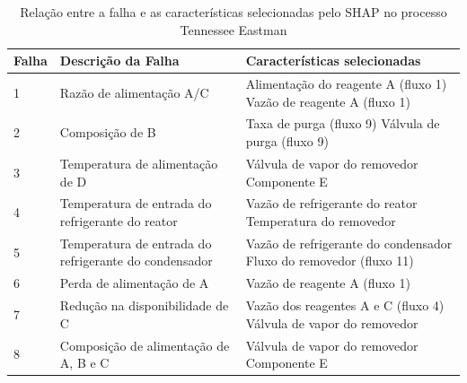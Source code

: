 \documentclass[
	12pt,				%
	openright,			%
	oneside,			%
	a4paper,			%
	english,			%
	french,				%
	spanish,			%
	brazil				%
	]{abntex2}
\begin{document}
\begin{apendicesenv}
  \begin{table}[!htbp]
    \centering
    \caption{ Relação entre a falha e as características selecionadas pelo SHAP no processo Tennessee Eastman }
    \begin{tabularx}{\textwidth}{|l|X|X|}
      \hline
      \textbf{\textbf{Falha}} & \textbf{\textbf{Descrição da Falha}}                  & \textbf{\textbf{Características selecionadas}}                                           \\ \hline
      1                       & Razão de alimentação A/C                              & Alimentação do reagente A (fluxo 1) \newline Vazão de reagente A (fluxo 1)               \\ \hline
      2                       & Composição de B                                       & Taxa de purga (fluxo 9) \newline Válvula de purga (fluxo 9)                              \\ \hline
      3                       & Temperatura de alimentação de D                       & Válvula de vapor do removedor \newline Componente E                                      \\ \hline
      4                       & Temperatura de entrada do refrigerante do reator      & Vazão de refrigerante do reator \newline Temperatura do removedor                        \\ \hline
      5                       & Temperatura de entrada do refrigerante do condensador & Vazão de refrigerante do condensador \newline Fluxo do removedor (fluxo 11)              \\ \hline
      6                       & Perda de alimentação de A                             & Vazão de reagente A (fluxo 1)                                                            \\ \hline
      7                       & Redução na disponibilidade de C                       & Vazão dos reagentes A e C (fluxo 4) \newline Válvula de vapor do removedor               \\ \hline
      8                       & Composição de alimentação de A, B e C                 & Válvula de vapor do removedor \newline Componente E                                      \\ \hline

\end{tabularx}
\end{table}
\end{apendicesenv}
\end{document}
